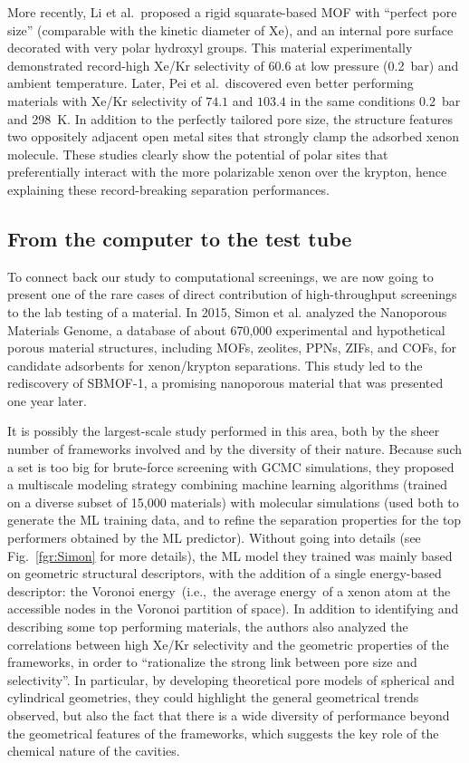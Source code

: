 \documentclass[main.tex]{subfiles}
\begin{document}
More recently, Li et al.\ proposed a rigid squarate-based MOF with ``perfect pore size'' (comparable with the kinetic diameter of Xe), and an internal pore surface decorated with very polar hydroxyl groups. This material experimentally demonstrated record-high Xe/Kr selectivity of $60.6$ at low pressure (\SI{0.2}{\bar}) and ambient temperature.\autocite{Li_2019} Later, Pei et al.\ discovered even better performing materials with Xe/Kr selectivity of $74.1$ and $103.4$ in the same conditions \SI{0.2}{\bar} and \SI{298}{\kelvin}. In addition to the perfectly tailored pore size, the structure features two oppositely adjacent open metal sites that strongly clamp the adsorbed xenon molecule.\autocite{Pei_2022} These studies clearly show the potential of polar sites that preferentially interact with the more polarizable xenon over the krypton, hence explaining these record-breaking separation performances. 

\subsection{From the computer to the test tube}

To connect back our study to computational screenings, we are now going to present one of the rare cases of direct contribution of high-throughput screenings to the lab testing of a material. In 2015, Simon et al.\autocite{Simon_2015} analyzed the Nanoporous Materials Genome,\autocite{Simon_2015_EES, Boyd_2017} a database of about 670,000 experimental and hypothetical porous material structures, including MOFs, zeolites, PPNs, ZIFs, and COFs, for candidate adsorbents for xenon/krypton separations. This study led to the rediscovery of SBMOF-1, a promising nanoporous material that was presented one year later.\autocite{Banerjee_2016}

It is possibly the largest-scale study performed in this area, both by the sheer number of frameworks involved and by the diversity of their nature. Because such a set is too big for brute-force screening with GCMC simulations, they proposed a multiscale modeling strategy combining machine learning algorithms (trained on a diverse subset of 15,000 materials) with molecular simulations (used both to generate the ML training data, and to refine the separation properties for the top performers obtained by the ML predictor). Without going into details (see Fig.~\ref{fgr:Simon} for more details), the ML model they trained was mainly based on geometric structural descriptors, with the addition of a single energy-based descriptor: the Voronoi energy\ (i.e.,\ the average energy\ of a xenon atom at the accessible nodes in the Voronoi partition of space). In addition to identifying and describing some top performing materials, the authors also analyzed the correlations between high Xe/Kr selectivity and the geometric properties of the frameworks, in order to ``rationalize the strong link between pore size and selectivity''. In particular, by developing theoretical pore models of spherical and cylindrical geometries, they could highlight the general geometrical trends observed, but also the fact that there is a wide diversity of performance beyond the geometrical features of the frameworks, which suggests the key role of the chemical nature of the cavities.
\end{document}
